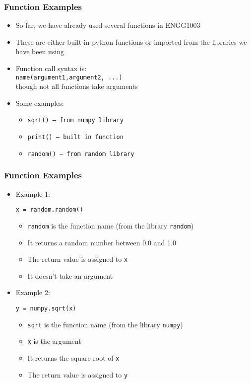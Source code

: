 \documentclass[english,14pt]{beamer}
\begin{document}
\begin{frame}
\frametitle{Function Examples}
\begin{itemize}
\item So far, we have already used several functions in ENGG1003
\item These are either built in python functions or imported from the libraries we have been using
\item Function call syntax is:\\
{\small \texttt{name(argument1,argument2, ...)} } \\
 though not all functions take arguments 
\item Some examples:
	\begin{itemize}
		\item \texttt{sqrt()  \;\;\;\; -- from numpy library}
		\item \texttt{print() \;\; -- built in function}
		\item \texttt{random() \; -- from random library}
	\end{itemize}
\end{itemize}
\end{frame}



\begin{frame}[fragile]
\frametitle{Function Examples}
\begin{itemize}
\item Example 1:
\begin{lstlisting}[style=CStyle]
x = random.random()
\end{lstlisting}
	\begin{itemize}
		\item \texttt{random} is the function name (from the library \texttt{random})
		\item It returns a random number between 0.0 and 1.0
		\item The return value is assigned to \texttt{x}
		\item It doesn't take an argument 	
	\end{itemize}
 
\item Example 2:
\begin{lstlisting}[style=CStyle]
y = numpy.sqrt(x)
\end{lstlisting}
	\begin{itemize}
		\item \texttt{sqrt} is the function name (from the library \texttt{numpy})
		\item \texttt{x} is the argument
		\item It returns the square root of \texttt{x}
		\item The return value is assigned to \texttt{y}
	\end{itemize}
\end{itemize}
\end{frame}
\end{document}
